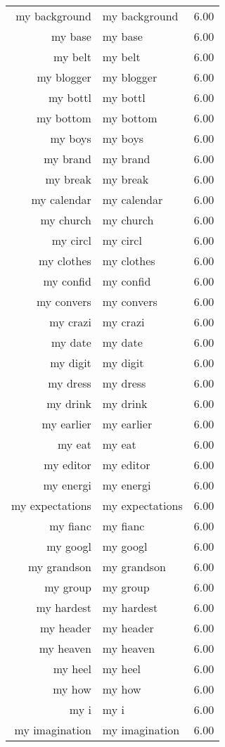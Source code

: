 \begin{table}[ht]
\begin{tabular}{rlr}
  my background & my background & 6.00 \\ 
  my base & my base & 6.00 \\ 
  my belt & my belt & 6.00 \\ 
  my blogger & my blogger & 6.00 \\ 
  my bottl & my bottl & 6.00 \\ 
  my bottom & my bottom & 6.00 \\ 
  my boys & my boys & 6.00 \\ 
  my brand & my brand & 6.00 \\ 
  my break & my break & 6.00 \\ 
  my calendar & my calendar & 6.00 \\ 
  my church & my church & 6.00 \\ 
  my circl & my circl & 6.00 \\ 
  my clothes & my clothes & 6.00 \\ 
  my confid & my confid & 6.00 \\ 
  my convers & my convers & 6.00 \\ 
  my crazi & my crazi & 6.00 \\ 
  my date & my date & 6.00 \\ 
  my digit & my digit & 6.00 \\ 
  my dress & my dress & 6.00 \\ 
  my drink & my drink & 6.00 \\ 
  my earlier & my earlier & 6.00 \\ 
  my eat & my eat & 6.00 \\ 
  my editor & my editor & 6.00 \\ 
  my energi & my energi & 6.00 \\ 
  my expectations & my expectations & 6.00 \\ 
  my fianc & my fianc & 6.00 \\ 
  my googl & my googl & 6.00 \\ 
  my grandson & my grandson & 6.00 \\ 
  my group & my group & 6.00 \\ 
  my hardest & my hardest & 6.00 \\ 
  my header & my header & 6.00 \\ 
  my heaven & my heaven & 6.00 \\ 
  my heel & my heel & 6.00 \\ 
  my how & my how & 6.00 \\ 
  my i & my i & 6.00 \\ 
  my imagination & my imagination & 6.00 \\ 

\end{tabular}
\end{table}
